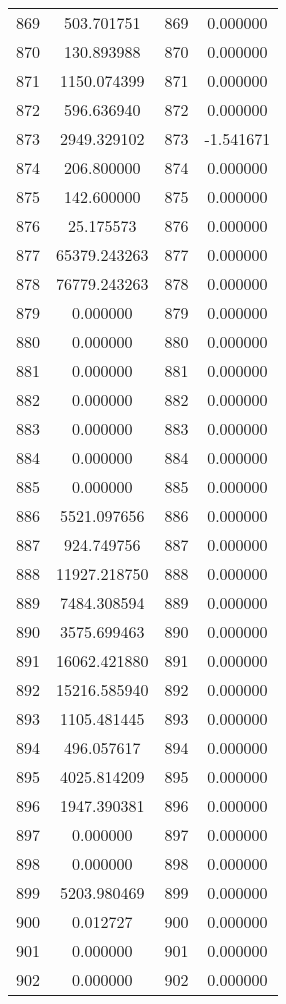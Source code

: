 \documentclass[12pt]{article}
\begin{document}
\begin{longtable}{@{}cccc@{}}
869 & 503.701751 & 869 & 0.000000 \\
870 & 130.893988 & 870 & 0.000000 \\
871 & 1150.074399 & 871 & 0.000000 \\
872 & 596.636940 & 872 & 0.000000 \\
873 & 2949.329102 & 873 & -1.541671 \\
874 & 206.800000 & 874 & 0.000000 \\
875 & 142.600000 & 875 & 0.000000 \\
876 & 25.175573 & 876 & 0.000000 \\
877 & 65379.243263 & 877 & 0.000000 \\
878 & 76779.243263 & 878 & 0.000000 \\
879 & 0.000000 & 879 & 0.000000 \\
880 & 0.000000 & 880 & 0.000000 \\
881 & 0.000000 & 881 & 0.000000 \\
882 & 0.000000 & 882 & 0.000000 \\
883 & 0.000000 & 883 & 0.000000 \\
884 & 0.000000 & 884 & 0.000000 \\
885 & 0.000000 & 885 & 0.000000 \\
886 & 5521.097656 & 886 & 0.000000 \\
887 & 924.749756 & 887 & 0.000000 \\
888 & 11927.218750 & 888 & 0.000000 \\
889 & 7484.308594 & 889 & 0.000000 \\
890 & 3575.699463 & 890 & 0.000000 \\
891 & 16062.421880 & 891 & 0.000000 \\
892 & 15216.585940 & 892 & 0.000000 \\
893 & 1105.481445 & 893 & 0.000000 \\
894 & 496.057617 & 894 & 0.000000 \\
895 & 4025.814209 & 895 & 0.000000 \\
896 & 1947.390381 & 896 & 0.000000 \\
897 & 0.000000 & 897 & 0.000000 \\
898 & 0.000000 & 898 & 0.000000 \\
899 & 5203.980469 & 899 & 0.000000 \\
900 & 0.012727 & 900 & 0.000000 \\
901 & 0.000000 & 901 & 0.000000 \\
902 & 0.000000 & 902 & 0.000000 \\

\end{longtable}
\end{document}

